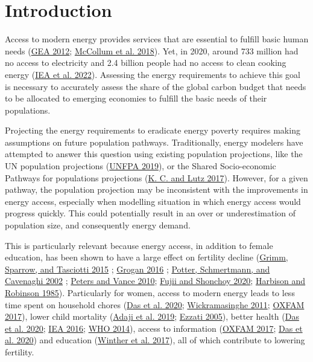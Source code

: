 \documentclass[
]{article}
\begin{document}
\newpage

\hypertarget{intro}{%
\section{Introduction}\label{intro}}

Access to modern energy provides services that are essential to fulfill basic human needs (\protect\hyperlink{ref-gea_global_2012}{GEA 2012}; \protect\hyperlink{ref-mccollum_connecting_2018}{McCollum et al. 2018}). Yet, in 2020, around 733 million had no access to electricity and 2.4 billion people had no access to clean cooking energy (\protect\hyperlink{ref-iea_tracking_2022}{IEA et al. 2022}). Assessing the energy requirements to achieve this goal is necessary to accurately assess the share of the global carbon budget that needs to be allocated to emerging economies to fulfill the basic needs of their populations.

Projecting the energy requirements to eradicate energy poverty requires making assumptions on future population pathways. Traditionally, energy modelers have attempted to answer this question using existing population projections, like the UN population projections (\protect\hyperlink{ref-unfpa_world_2019}{UNFPA 2019}), or the Shared Socio-economic Pathways for populations projections (\protect\hyperlink{ref-kc_human_2017}{K. C. and Lutz 2017}). However, for a given pathway, the population projection may be inconsistent with the improvements in energy access, especially when modelling situation in which energy access would progress quickly. This could potentially result in an over or underestimation of population size, and consequently energy demand.

This is particularly relevant because energy access, in addition to female education, has been shown to have a large effect on fertility decline (\protect\hyperlink{ref-grimm_does_2015}{Grimm, Sparrow, and Tasciotti 2015} ; \protect\hyperlink{ref-grogan_household_2016}{Grogan 2016} ; \protect\hyperlink{ref-potter_fertility_2002}{Potter, Schmertmann, and Cavenaghi 2002} ; \protect\hyperlink{ref-peters_rural_2010}{Peters and Vance 2010}; \protect\hyperlink{ref-fujii_fertility_2020}{Fujii and Shonchoy 2020}; \protect\hyperlink{ref-harbison_rural_1985}{Harbison and Robinson 1985}). Particularly for women, access to modern energy leads to less time spent on household chores (\protect\hyperlink{ref-das_virtuous_2020}{Das et al. 2020}; \protect\hyperlink{ref-wickramasinghe_energy_2011}{Wickramasinghe 2011}; \protect\hyperlink{ref-oxfam_energy_2017}{OXFAM 2017}), lower child mortality (\protect\hyperlink{ref-adaji_understanding_2019}{Adaji et al. 2019}; \protect\hyperlink{ref-ezzati_indoor_2005}{Ezzati 2005}), better health (\protect\hyperlink{ref-das_virtuous_2020}{Das et al. 2020}; \protect\hyperlink{ref-iea_weo-2016_2016}{IEA 2016}; \protect\hyperlink{ref-who_who_2014}{WHO 2014}), access to information (\protect\hyperlink{ref-oxfam_energy_2017}{OXFAM 2017}; \protect\hyperlink{ref-das_virtuous_2020}{Das et al. 2020}) and education (\protect\hyperlink{ref-winther_womens_2017}{Winther et al. 2017}), all of which contribute to lowering fertility.
\end{document}
